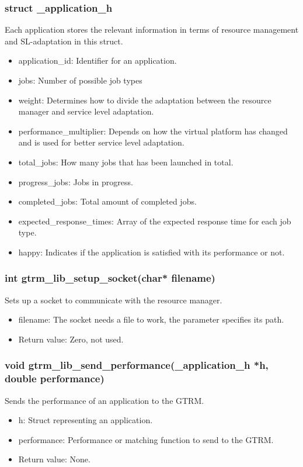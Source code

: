\documentclass[nobiblatex]{LTHthesis}
\begin{document}
\subsubsection{struct \_application\_h}
Each application stores the relevant information in terms of resource management and SL-adaptation in this struct.
\begin{itemize}
\item application\_id: Identifier for an application.
\item jobs: Number of possible job types
\item weight: Determines how to divide the adaptation between the resource manager and service level adaptation.
\item performance\_multiplier: Depends on how the virtual platform has changed and is used for better service level adaptation.
\item total\_jobs: How many jobs that has been launched in total.
\item progress\_jobs: Jobs in progress.
\item completed\_jobs: Total amount of completed jobs.
\item expected\_response\_times: Array of the expected response time for each job type.
\item happy: Indicates if the application is satisfied with its performance or not.
\end{itemize}

\subsubsection{int gtrm\_lib\_setup\_socket(char* filename)}
Sets up a socket to communicate with the resource manager.
\begin{itemize}
\item filename: The socket needs a file to work, the parameter specifies its path.
\item Return value: Zero, not used.
\end{itemize}

\subsubsection{void gtrm\_lib\_send\_performance(\_application\_h *h, double performance)}
Sends the performance of an application to the GTRM.
\begin{itemize}
\item h: Struct representing an application.
\item performance: Performance or matching function to send to the GTRM.
\item Return value: None.
\end{itemize}
\end{document}
